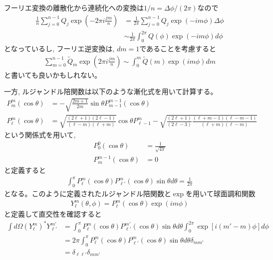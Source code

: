 \documentclass[a4j, 12pt]{ltjarticle}
\begin{document}
    フーリエ変換の離散化から連続化への変換は$1/n = \Delta \phi/(2\pi)$なので
    \begin{align}
        \frac{1}{n}\sum_{j=0}^{n-1}Q_j \exp\left(-2\pi i \frac{jm}{n}\right)
        &= \frac{1}{2\pi}\sum_{j=0}^{n-1}Q_j\exp\left(-im\phi \right) \Delta \phi \\
        &\sim \frac{1}{2\pi}\int_0^{2\pi} Q(\phi) \exp(-im\phi)d\phi
    \end{align}
    となっているし, フーリエ逆変換は, $dm = 1$であることを考慮すると
    \begin{align}
        \sum_{m=0}^{n-1}\tilde{Q}_m\exp\left(2\pi i \frac{jm}{n}\right) \sim
        \int_0^m \tilde{Q}(m) \exp\left(im\phi\right) dm
    \end{align}
    と書いても良いかもしれない。
    \par
    一方, ルジャンドル陪関数は以下のような漸化式を用いて計算する。
    \begin{align}
        P^m_m(\cos\theta) &= -\sqrt{\frac{2m+1}{2m}}\sin\theta P_{m-1}^{m-1}(\cos\theta) \\
        P^m_\ell (\cos\theta) &= \sqrt{\frac{(2\ell+1)(2\ell-1)}{(\ell - m)(\ell + m)}}\cos\theta P_{\ell-1}^m
        - \sqrt{\frac{(2\ell+1)}{(2\ell-3)}\frac{(\ell + m - 1)(\ell - m - 1)}{(\ell + m)(\ell - m)}}
    \end{align}
    という関係式を用いて, 
    \begin{align}
        P_0^0(\cos\theta) &= \frac{1}{\sqrt{4\pi}} \\
        P_m^{m-1}(\cos\theta) &= 0
    \end{align}
    と定義すると
    \begin{align}
        \int_0^\pi P_\ell^m(\cos\theta)P_{\ell'}^m(\cos\theta) \sin\theta d\theta = \frac{1}{2\pi}
    \end{align}
    となる。このように定義されたルジャンドル陪関数と$\exp$を用いて球面調和関数
    \begin{align}
        Y_\ell^m(\theta,\phi) = P_\ell^m (\cos\theta)\exp(im\phi)
    \end{align}
    と定義して直交性を確認すると
    \begin{align}
        \int d\Omega (Y_\ell^m)^* Y_{\ell'}^{m'} &=
        \int_0^{\pi} P_\ell^m(\cos\theta)P_{\ell'}^{m'}(\cos\theta)\sin\theta d\theta 
        \int_0^{2\pi} \exp\left[i(m'-m)\phi\right] d\phi \\
        &= 2\pi\int_0^{\pi} P_\ell^m(\cos\theta)P_{\ell'}^{m}(\cos\theta)\sin\theta d\theta \delta_{mm'} \\
        & = \delta_{\ell\ell'}\delta_{mm'}
    \end{align}
\end{document}
